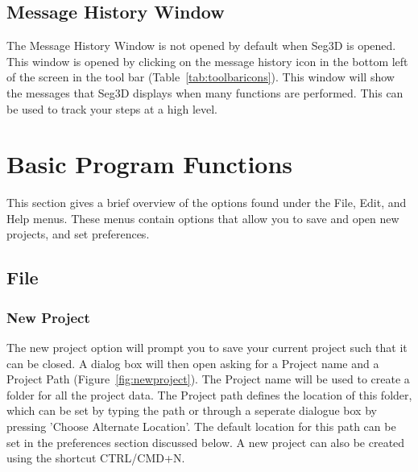 \documentclass[fleqn,11pt,openany]{book}
\begin{document}
\section{Message History Window}
\label{sec:messagehistory}
The Message History Window is not opened by default when Seg3D is opened.
This window is opened by clicking on the message history icon in the bottom left of the screen in the tool bar (Table~\ref{tab:toolbaricons}).
This window will show the messages that Seg3D displays when many functions are performed.  This can be used to track your steps at a high level.  




\chapter{Basic Program Functions}
\label{sec:functions}

\begin{introduction}
This section gives a brief overview of the options found under the File, Edit, and Help menus. These menus contain options
that allow you to save and open new projects, and set preferences. 

\end{introduction}

\section{File}
\label{sec:file}

\subsection{New Project}
\label{sec:newproject}
The new project option will prompt you to save your current project such that it can be closed. A dialog box will then open
asking for a Project name and a Project Path (Figure~\ref{fig:newproject}).  The Project name will be used to create a folder for all the project data.  The Project path defines the location of this folder, which can be set by typing the path or through a seperate dialogue box by pressing 'Choose Alternate Location'.  The default location for this path can be set in the preferences section discussed below. A new project can also be created using the shortcut CTRL/CMD+N.
\end{document}
